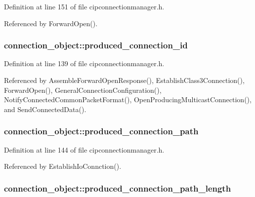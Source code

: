 \-Definition at line 151 of file cipconnectionmanager.\-h.



\-Referenced by \-Forward\-Open().

\hypertarget{structconnection__object_a1094de5e83a2b9f85b2a622c1a01bfbe}{
\subsubsection[{produced\-\_\-connection\-\_\-id}]{ {\bf connection\-\_\-object\-::produced\-\_\-connection\-\_\-id}}}\label{d1/d48/structconnection__object_a1094de5e83a2b9f85b2a622c1a01bfbe}


\-Definition at line 139 of file cipconnectionmanager.\-h.



\-Referenced by \-Assemble\-Forward\-Open\-Response(), \-Establish\-Class3\-Connection(), \-Forward\-Open(), \-General\-Connection\-Configuration(), \-Notify\-Connected\-Common\-Packet\-Format(), \-Open\-Producing\-Multicast\-Connection(), and \-Send\-Connected\-Data().

\hypertarget{structconnection__object_a0a9a5ce0afe8cd5890c11e901bc9a099}{
\subsubsection[{produced\-\_\-connection\-\_\-path}]{ {\bf connection\-\_\-object\-::produced\-\_\-connection\-\_\-path}}}\label{d1/d48/structconnection__object_a0a9a5ce0afe8cd5890c11e901bc9a099}


\-Definition at line 144 of file cipconnectionmanager.\-h.



\-Referenced by \-Establish\-Io\-Connction().

\hypertarget{structconnection__object_a7c7b4c524189f7894f06ca75187a756c}{
\subsubsection[{produced\-\_\-connection\-\_\-path\-\_\-length}]{ {\bf connection\-\_\-object\-::produced\-\_\-connection\-\_\-path\-\_\-length}}}\label{d1/d48/structconnection__object_a7c7b4c524189f7894f06ca75187a756c}


